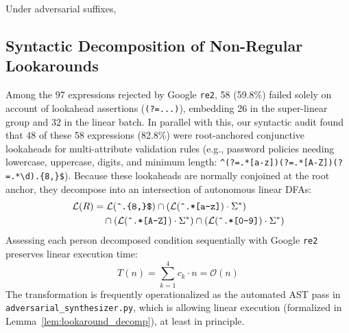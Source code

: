 \documentclass{ieeeaccess}
\begin{document}
Under adversarial suffixes, 

\subsection{Syntactic Decomposition of Non-Regular Lookarounds}\label{sec:lookaround_decomp}
Among the 97 expressions rejected by Google \texttt{re2}, 58 (59.8\%) failed solely on account of lookahead assertions (\texttt{(?=...)}), embedding 26 in the super-linear group and 32 in the linear batch. In parallel with this, our syntactic audit found that 48 of these 58 expressions (82.8\%) were root-anchored conjunctive lookaheads for multi-attribute validation rules (e.g., password policies needing lowercase, uppercase, digits, and minimum length: \texttt{\^{}(?=.*[a-z])(?=.*[A-Z])(?=.*\textbackslash d).\{8,\}\$}). Because these lookaheads are normally conjoined at the root anchor, they decompose into an intersection of autonomous linear DFAs:
\begin{align}\label{eq:lookaround_decomp_prod}
\mathcal{L}(R) &= \mathcal{L}(\text{\texttt{\^{}.\{8,\}\$}}) \cap (\mathcal{L}(\text{\texttt{\^{}.*[a-z]}}) \cdot \Sigma^*) \notag \\
&\quad \cap (\mathcal{L}(\text{\texttt{\^{}.*[A-Z]}}) \cdot \Sigma^*) \cap (\mathcal{L}(\text{\texttt{\^{}.*[0-9]}}) \cdot \Sigma^*)
\end{align}
Assessing each person decomposed condition sequentially with Google \texttt{re2} preserves linear execution time:
\begin{equation}\label{eq:lookaround_linear_eval}
T(n) = \sum_{k=1}^4 c_k \cdot n = \mathcal{O}(n)
\end{equation}
The transformation is frequently operationalized as the automated AST pass in \texttt{adversarial\_synthesizer.py}, which is allowing linear execution (formalized in Lemma~\ref{lem:lookaround_decomp}), at least in principle.
\end{document}
